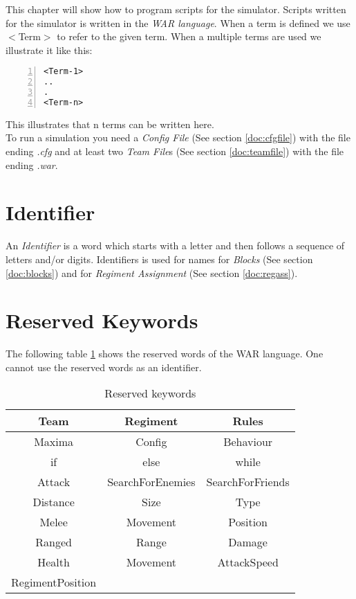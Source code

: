 This chapter will show how to program scripts for the simulator. Scripts written for the simulator is written in the {\it WAR language}. 
When a term is defined we use $<$Term$>$ to refer to the given term. 
When a multiple terms are used we illustrate it like this: \\

\begin{lstlisting}[basicstyle=\small\sffamily,
keywordstyle={\color{blue}},
comment={[l]{//}}, morecomment={[s]{/*}{*/}}, commentstyle=\itshape,
columns={[l]flexible}, numbers=left, numberstyle=\tiny,
frameround=fftt, frame=shadowbox, captionpos=b,
caption={Scripting}]
<Term-1>
..
.
<Term-n>
\end{lstlisting}
This illustrates that n terms can be written here. \\

To run a simulation you need a {\it Config File} (See section \ref{doc:cfgfile}) with the file ending {\it .cfg} and at least two {\it Team File}s 
(See section \ref{doc:teamfile}) with the file ending {\it .war}.

\section{Identifier}
	An {\it Identifier} is a word which starts with a letter and then follows a sequence of letters and/or digits.
	Identifiers is used for names for {\it Blocks} (See section \ref{doc:blocks}) and for {\it Regiment Assignment} (See section \ref{doc:regass}).
\section{Reserved Keywords}

The following table \ref{reserved_keywords} shows the reserved words of the WAR language. One cannot use the reserved words as an identifier.

\begin{table}[H]

\begin{tabular}{|c | c | c|}
\hline
 Team			&			Regiment					&		Rules				\\
\hline
 Maxima		&			Config						&		Behaviour 		\\						
\hline
 if					&			else							&		 while 				\\							
\hline
 Attack			&			SearchForEnemies 	&	SearchForFriends	\\					
\hline
 Distance		&		 	Size							&		Type					\\ 									
\hline
 Melee			&			Movement				&		Position			\\								
\hline
 Ranged		&			Range						&		Damage			\\								
\hline
 Health			&			Movement				&		AttackSpeed		\\						
\hline
 RegimentPosition & 								&								\\				
\hline
\end{tabular}
\caption{Reserved keywords}
\label{reserved_keywords}
\end{table}
